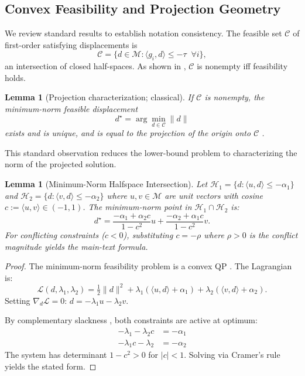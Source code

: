 \documentclass{article}
\theoremstyle{plain}
\newtheorem{lemma}[theorem]{Lemma}
\theoremstyle{definition}
\theoremstyle{remark}
\begin{document}
\subsection{Convex Feasibility and Projection Geometry}\label{app:convex}

We review standard results to establish notation consistency.
The feasible set $\mathcal{C}$ of first-order satisfying displacements is
\[
\mathcal{C}
= \{ d \in \mathcal{M} : \langle g_i,d \rangle \le -\tau \;\;\forall i \},
\]
an intersection of closed half-spaces.
As shown in \citet[Sec.~2.2]{boyd2004convex}, $\mathcal{C}$ is nonempty iff feasibility holds.

\begin{lemma}[Projection characterization; classical]
\label{lem:proj_standard}
If $\mathcal{C}$ is nonempty, the minimum-norm feasible displacement
\[
d^\star = \arg\min_{d \in \mathcal{C}} \|d\|
\]
exists and is unique, and is equal to the projection of the origin onto $\mathcal{C}$
\citep[Thm.~2.1]{boyd2004convex}.
\end{lemma}

This standard observation reduces the lower-bound problem to characterizing
the norm of the projected solution.

\begin{lemma}[Minimum-Norm Halfspace Intersection]\label{lem:halfspace}
Let $\mathcal{H}_1 = \{d : \langle u, d \rangle \le -\alpha_1\}$ and $\mathcal{H}_2 = \{d : \langle v, d \rangle \le -\alpha_2\}$ where $u,v\in\mathcal{M}$ are unit vectors with cosine $c := \langle u, v \rangle \in (-1,1)$. The minimum-norm point in $\mathcal{H}_1 \cap \mathcal{H}_2$ is:
\[
d^\star = \frac{-\alpha_1 + \alpha_2 c}{1-c^2}u + \frac{-\alpha_2 + \alpha_1 c}{1-c^2}v.
\]
For conflicting constraints ($c < 0$), substituting $c = -\rho$ where $\rho > 0$ is the conflict magnitude yields the main-text formula.
\end{lemma}

\begin{proof}
The minimum-norm feasibility problem is a convex QP \citep[Chap.~4]{boyd2004convex}. The Lagrangian is:
\[
\mathcal{L}(d,\lambda_1,\lambda_2) = \tfrac{1}{2}\|d\|^2 + \lambda_1(\langle u,d \rangle+\alpha_1) + \lambda_2(\langle v,d \rangle+\alpha_2).
\]
Setting $\nabla_d \mathcal{L} = 0$: $d = -\lambda_1 u - \lambda_2 v$.

By complementary slackness \citep[Sec.~5.5.2]{boyd2004convex}, both constraints are active at optimum:
\begin{align*}
-\lambda_1 - \lambda_2 c &= -\alpha_1\\
-\lambda_1 c - \lambda_2 &= -\alpha_2
\end{align*}
The system has determinant $1-c^2 > 0$ for $|c| < 1$. Solving via Cramer's rule yields the stated form.
\end{proof}
\end{document}
